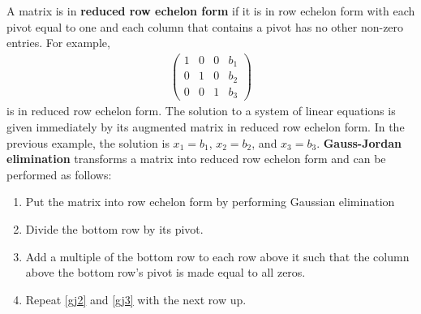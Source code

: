 \documentclass[12pt,reqno]{amsart}
\theoremstyle{definition}
\begin{document}
A matrix is in \textbf{reduced row echelon form} if it is in row
echelon form with each pivot equal to one and each column that
contains a pivot has no other non-zero entries. For example,
\begin{align*}
  \begin{pmatrix}
    1 & 0 & 0 & b_1 \\
    0 & 1 & 0 & b_2 \\
    0 & 0 & 1 & b_3 
  \end{pmatrix}
\end{align*}
is in reduced row echelon form. The solution to a system of linear
equations is given immediately by its augmented matrix in reduced row
echelon form. In the previous example, the solution is $x_1 = b_1$,
$x_2 = b_2$, and $x_3 = b_3$. 
\textbf{Gauss-Jordan elimination} transforms a matrix into reduced row
echelon form and can be performed as follows:
\renewcommand{\theenumi}{GJ\arabic{enumi}}
\begin{enumerate}
\item\label{gj1} Put the matrix into row echelon form by performing
  Gaussian elimination
\item\label{gj2} Divide the bottom row by its pivot. 
\item\label{gj3} Add a multiple of the bottom row to each row above it
  such that the column above the bottom row's pivot is made equal to
  all zeros.
\item\label{gj4} Repeat \ref{gj2} and \ref{gj3} with the next row up.
\end{enumerate}
\end{document}
